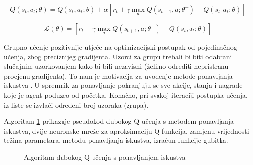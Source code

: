 \begin{equation}
    \label{md:dqn-bellman}
    Q(s_t, a_t; \theta) = Q(s_t, a_t; \theta) + \alpha \left[ r_t + \gamma \max_a Q(s_{t+1}, a; \theta^-) - Q(s_t, a_t; \theta) \right]
\end{equation}

\begin{equation}
    \label{md:dqn-loss}
    \mathcal{L}(\theta) = \left[ r_t + \gamma \max_a Q(s_{t+1}, a; \theta^-) - Q(s_t, a_t; \theta) \right]
\end{equation}

\bigskip


Grupno  učenje pozitivnije utječe na optimizacijski postupak od pojedinačnog učenja, zbog preciznijeg gradijenta. Uzorci za grupu trebali bi biti odabrani slučajnim uzorkovanjem kako bi bili nezavisni (želimo odrediti nepristranu procjenu gradijenta). To nam je motivacija za uvođenje metode ponavljanja iskustva . U spremnik za ponavljanje  pohranjuju se sve akcije, stanja i nagrade koje je agent poduzeo od početka. Konačno, pri svakoj iteraciji postupka učenja, iz liste se izvlači određeni broj uzoraka (grupa).


Algoritam \ref{fig:dql-algorithm} prikazuje pseudokod dubokog Q učenja s metodom ponavljanja iskustva, dvije neuronske mreže za aproksimaciju Q funkcija, zamjenu vrijednosti težina parametara, metodu ponavljanja iskustva, izračun funkcije gubitka. 

\begin{figure}[H]
    \centering
    \caption{Algoritam dubokog Q učenja s ponavljanjem iskustva}
    \label{fig:dql-algorithm}
\end{figure}

